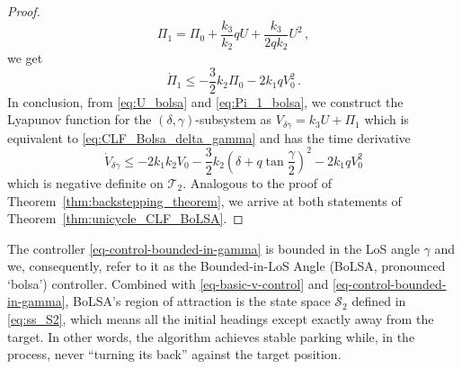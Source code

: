 \documentclass[letterpaper, 10 pt, conference]{ieeeconf}  %
\newcommand{\abs}[1]{\left\lvert#1\right\rvert}
\begin{document}
\begin{proof}
\begin{equation}
\Pi_1 = \Pi_0 + \frac{k_3 }{k_2} q  U  + \frac{k_3 }{2 q k_2} U^2\,, \label{eq:Pi_1_bolsa}
\end{equation}
we get
\begin{equation}
\dot\Pi_1 \leq - \frac{3}{2}k_2\Pi_0 - 2 k_1 q V_0^2\,.
\end{equation}
In conclusion, from \eqref{eq:U_bolsa} and \eqref{eq:Pi_1_bolsa}, we construct the Lyapunov function for the $(\delta, \gamma)$-subsystem as $V_{\delta \gamma} = k_3 U + \Pi_1$ which is equivalent to \eqref{eq:CLF_Bolsa_delta_gamma} 
and has the time derivative \begin{equation}
\dot V_{\delta \gamma} \le  - 2k_1 k_2 V_0 - \frac{3}{2}k_2 \left(\delta + q \tan \frac{\gamma}{2}\right)^2 - 2k_1 q V_0^2
\label{eq:V_dot_Bolsa}
\end{equation} 
which is negative definite on $\mathcal{T}_2$. Analogous to the proof of Theorem~\ref{thm:backstepping_theorem}, we arrive at both statements of Theorem~\ref{thm:unicycle_CLF_BoLSA}.
\end{proof}

The controller \eqref{eq-control-bounded-in-gamma}
is bounded in the LoS angle $\gamma$ and we, consequently, refer to it as the Bounded-in-LoS Angle (BoLSA, pronounced `bolsa') controller. Combined with \eqref{eq-basic-v-control} and \eqref{eq-control-bounded-in-gamma}, BoLSA's region of attraction is the state space 
$\mathcal{S}_2$ defined in \eqref{eq:ss_S2},
which means all the initial headings except exactly away from the target. In other words, the algorithm achieves stable parking while, in the process, never ``turning its back'' against the target position.
\end{document}
